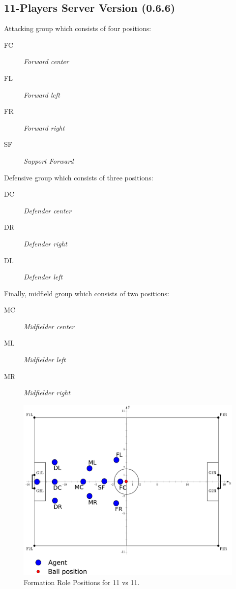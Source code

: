 \subsection{11-Players Server Version (0.6.6)}
Attacking group which consists of four positions:
\begin{description}
\item[FC] \textit{Forward center}
\item[FL] \textit{Forward left}
\item[FR] \textit{Forward right}
\item[SF] \textit{Support Forward}
\end{description}
Defensive group which consists of three positions:
\begin{description}
\item[DC] \textit{Defender center}
\item[DR] \textit{Defender right }
\item[DL] \textit{Defender left}
\end{description}
Finally, midfield group which consists of two positions:
\begin{description}
\item[MC] \textit{Midfielder center}
\item[ML] \textit{Midfielder left}
\item[MR] \textit{Midfielder right}
\end{description}
\begin{figure}[htb!]
\centering
  \includegraphics[width=\textwidth]{Chapter4/figures/Formation11_0.pdf}
  \caption{Formation Role Positions for 11 vs 11.} 
  \label{fig:Formation11_0}
\end{figure}
